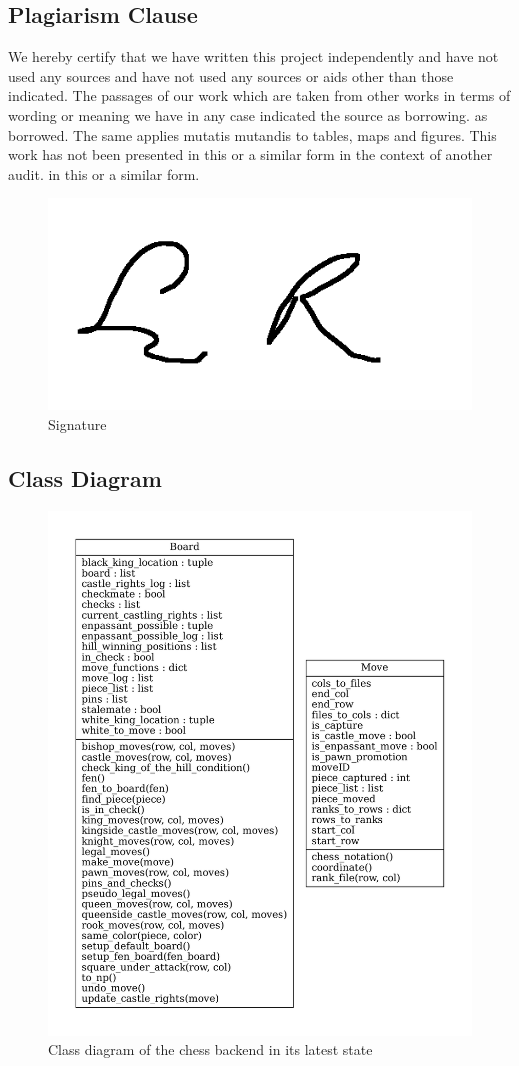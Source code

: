 \subsection*{Plagiarism Clause}

We hereby certify that we have written this project independently and have not used any sources
and have not used any sources or aids other than those indicated. The passages
of our work which are taken from other works in terms of wording or meaning
we have in any case indicated the source as borrowing.
as borrowed. The same applies mutatis mutandis to tables, maps and figures. This work
has not been presented in this or a similar form in the context of another audit.
in this or a similar form.

\begin{figure}[hbtp]
	\centering
	\includegraphics[width=.5\linewidth, page=1]{reference/signature/l_sign.png}
	\caption{Signature}
\end{figure}

\pagebreak

\subsection*{Class Diagram}

\begin{figure}[hbtp]
	\centering
	\includegraphics[width=0.7\linewidth, page=1]{reference/pics/class-diagram.pdf}
	\caption{Class diagram of the chess backend in its latest state}
  \label{fig:class-diagram}
\end{figure}
